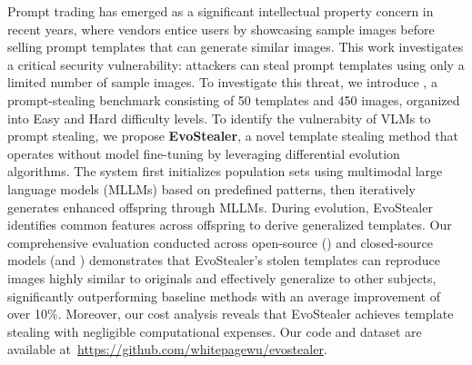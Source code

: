 
Prompt trading has emerged as a significant intellectual property concern in recent years, where vendors entice users by showcasing sample images before selling prompt templates that can generate similar images. This work investigates a critical security vulnerability: attackers can steal prompt templates using only a limited number of sample images. 
To investigate this threat, we introduce \textbf{\data}, a prompt-stealing benchmark consisting of 50 templates and 450 images, organized into Easy and Hard difficulty levels.
To identify the vulnerabity of VLMs to prompt stealing, we propose \textbf{EvoStealer}, a novel template stealing method that operates without model fine-tuning by leveraging differential evolution algorithms. The system first initializes population sets using multimodal large language models (MLLMs) based on predefined patterns, then iteratively generates enhanced offspring through MLLMs. During evolution, EvoStealer identifies common features across offspring to derive generalized templates. 
Our comprehensive evaluation conducted across open-source (\intern) and closed-source models (\gpta and \gpt) demonstrates that EvoStealer's stolen templates can reproduce images highly similar to originals and effectively generalize to other subjects, significantly outperforming baseline methods with an average improvement of over 10\%. Moreover, our cost analysis reveals that EvoStealer achieves template stealing with negligible computational expenses. Our code and dataset are available at~\url{https://github.com/whitepagewu/evostealer}.